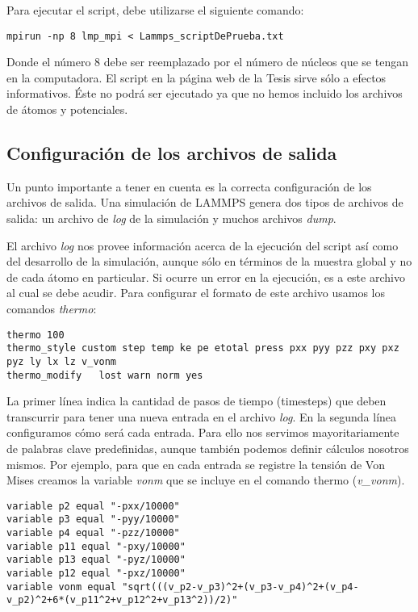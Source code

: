 Para ejecutar el script, debe utilizarse el siguiente comando:

\begin{lstlisting}
mpirun -np 8 lmp_mpi < Lammps_scriptDePrueba.txt 
\end{lstlisting}

Donde el número 8 debe ser reemplazado por el número de núcleos que se tengan en la computadora. El script en la página web de la Tesis sirve sólo a efectos informativos. Éste no podrá ser ejecutado ya que no hemos incluido los archivos de átomos y potenciales.

\subsection{Configuración de los archivos de salida}
\label{AA_2_1}

Un punto importante a tener en cuenta es la correcta configuración de los archivos de salida. Una simulación de LAMMPS genera dos tipos de archivos de salida: un archivo de \textit{log} de la simulación y muchos archivos \textit{dump}.

El archivo \textit{log} nos provee información acerca de la ejecución del script así como del desarrollo de la simulación, aunque sólo en términos de la muestra global y no de cada átomo en particular. Si ocurre un error en la ejecución, es a este archivo al cual se debe acudir. Para configurar el formato de este archivo usamos los comandos \textit{thermo}:

\begin{lstlisting}
thermo 100
thermo_style custom step temp ke pe etotal press pxx pyy pzz pxy pxz pyz ly lx lz v_vonm
thermo_modify	lost warn norm yes
\end{lstlisting}

La primer línea indica la cantidad de pasos de tiempo (timesteps) que deben transcurrir para tener una nueva entrada en el archivo \textit{log}. En la segunda línea configuramos cómo será cada entrada. Para ello nos servimos mayoritariamente de palabras clave predefinidas, aunque también podemos definir cálculos nosotros mismos. Por ejemplo, para que en cada entrada se registre la tensión de Von Mises creamos la variable \textit{vonm} que se incluye en el comando thermo (\textit{v\_vonm}).

\begin{lstlisting}
variable p2 equal "-pxx/10000"
variable p3 equal "-pyy/10000"
variable p4 equal "-pzz/10000"
variable p11 equal "-pxy/10000"
variable p13 equal "-pyz/10000"
variable p12 equal "-pxz/10000"
variable vonm equal "sqrt(((v_p2-v_p3)^2+(v_p3-v_p4)^2+(v_p4-v_p2)^2+6*(v_p11^2+v_p12^2+v_p13^2))/2)"
\end{lstlisting}

